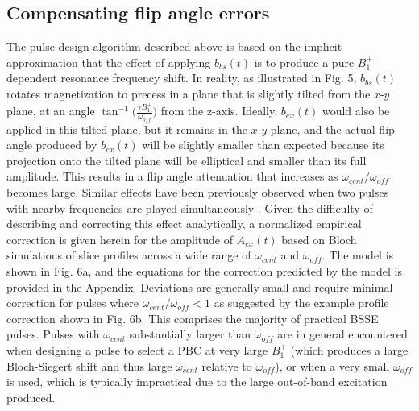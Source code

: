 \documentclass{article}
\newcommand{\bext}{b_{ex}(t)}
\newcommand{\bbst}{b_{bs}(t)}
\renewcommand{\textcolor}[1]{}
\begin{document}
\subsection*{Compensating flip angle errors}
\textcolor{blue}{The pulse design algorithm described above is based on the implicit approximation
that the effect of applying $\bbst$ is to produce a pure $B_1^+$-dependent 
resonance frequency shift.
In reality, as illustrated in Fig. 5, 
$\bbst$ rotates magnetization to precess in a plane that is slightly tilted from 
the $x$-$y$ plane, 
at an angle $\tan^{-1}\Big(\frac{\gamma B_1^+}{\omega_{off}}\Big)$ from the z-axis. 
Ideally, $\bext$ would also be applied in this tilted plane,
but it remains in the $x$-$y$ plane,
and the actual flip angle produced by $\bext$ will be slightly smaller than expected
because its projection onto the tilted plane will be elliptical and smaller than its full amplitude.
This results in a flip angle attenuation that increases as $\omega_{cent}/\omega_{off}$ becomes large.
Similar effects have been previously observed when two pulses with nearby frequencies are played simultaneously \cite{Mccoy1993SelectiveDecoupling, Steffen2000}.
Given the difficulty of describing and correcting this effect analytically, a
normalized empirical correction is given herein for the amplitude of $A_{ex}(t)$ based on Bloch simulations of slice profiles across a wide range of $\omega_{cent}$ and $\omega_{off}$. 
The model is shown in Fig. 6a, 
and the equations for the correction predicted by the model is provided in the Appendix. 
Deviations are generally small and require minimal correction for pulses where 
$\omega_{cent}/ \omega_{off} < 1$ as suggested by the example profile correction shown in Fig. 6b. This comprises the majority of practical BSSE pulses. 
Pulses with $\omega_{cent}$ substantially larger than $\omega_{off}$ are in general encountered when designing a pulse to select a PBC at very large $B_1^+$ (which produces a large Bloch-Siegert shift and thus large $\omega_{cent}$ relative to $\omega_{off}$), or when a very small $\omega_{off}$ is used, which is typically impractical due to the large out-of-band excitation produced.  }
\end{document}
